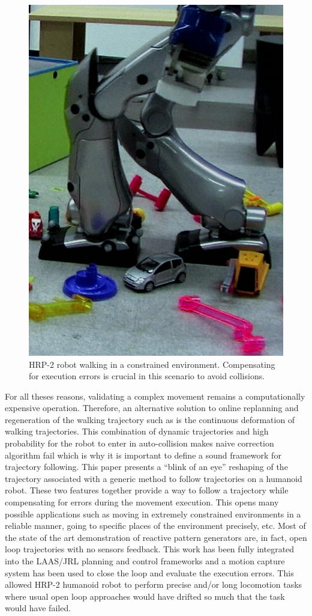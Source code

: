 \begin{figure}[ht!]
  \begin{center}
    \includegraphics[width=.4\textwidth]{fig/exp2.jpg}
  \end{center}
  \caption{HRP-2 robot walking in a constrained
    environment. Compensating for execution errors is crucial in this
    scenario to avoid collisions. \label{fig:following}}
\end{figure}
%
%
%
For all theses reasons, validating a complex movement remains a
computationally expensive operation. Therefore, an alternative
solution to online replanning and regeneration of the walking
trajectory such as \cite{11icra.dimitrov, 10ar.herdt,
  06icra.nishiwaki, 05humanoids.michel} is the continuous deformation
of walking trajectories.  This combination of dynamic trajectories and
high probability for the robot to enter in auto-collision makes naive
correction algorithm fail which is why it is important to define a
sound framework for trajectory following.
%
%
This paper presents a ``blink of an eye'' reshaping of the trajectory
associated with a generic method to follow trajectories on a humanoid
robot. These two features together provide a way to follow a
trajectory while compensating for errors during the movement
execution. This opens many possible applications such as moving in
extremely constrained environments in a reliable manner, going to
specific places of the environment precisely, etc. Most of the state
of the art demonstration of reactive pattern generators are, in fact,
open loop trajectories with no sensors feedback. This work has been
fully integrated into the LAAS/JRL planning and control frameworks and
a motion capture system has been used to close the loop and evaluate
the execution errors.
%
This allowed HRP-2 humanoid robot to perform precise and/or long
locomotion tasks where usual open loop approaches would have drifted
so much that the task would have failed.
%
%
